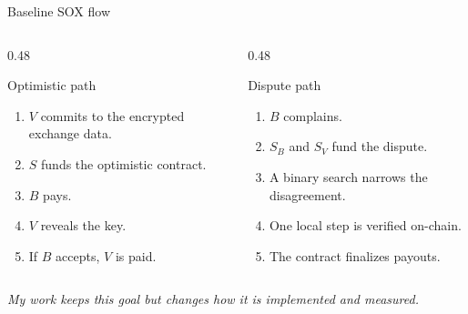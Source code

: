 \documentclass[aspectratio=169,10pt]{beamer}
\begin{document}
\begin{frame}{Baseline SOX flow}
  \begin{columns}[T,onlytextwidth]
    \begin{column}{0.48\textwidth}
      \begin{block}{Optimistic path}
        \begin{enumerate}
          \item \(V\) commits to the encrypted exchange data.
          \item \(S\) funds the optimistic contract.
          \item \(B\) pays.
          \item \(V\) reveals the key.
          \item If \(B\) accepts, \(V\) is paid.
        \end{enumerate}
      \end{block}
    \end{column}
    \begin{column}{0.48\textwidth}
      \begin{block}{Dispute path}
        \begin{enumerate}
          \item \(B\) complains.
          \item \(S_B\) and \(S_V\) fund the dispute.
          \item A binary search narrows the disagreement.
          \item One local step is verified on-chain.
          \item The contract finalizes payouts.
        \end{enumerate}
      \end{block}
    \end{column}
  \end{columns}
  \vspace{0.5em}
  \centering
  \textit{My work keeps this goal but changes how it is implemented and measured.}
\end{frame}
\end{document}
